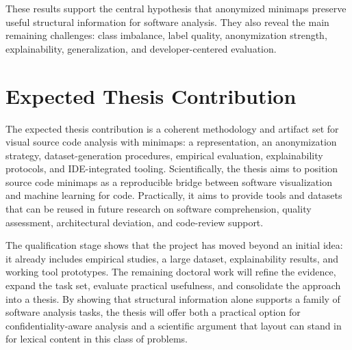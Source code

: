 These results support the central hypothesis that anonymized minimaps preserve
useful structural information for software analysis. They also reveal the main
remaining challenges: class imbalance, label quality, anonymization strength,
explainability, generalization, and developer-centered evaluation.

\section{Expected Thesis Contribution}

The expected thesis contribution is a coherent methodology and artifact set for
visual source code analysis with minimaps: a representation, an anonymization
strategy, dataset-generation procedures, empirical evaluation, explainability
protocols, and IDE-integrated tooling. Scientifically, the thesis aims to
position source code minimaps as a reproducible bridge between software
visualization and machine learning for code. Practically, it aims to provide
tools and datasets that can be reused in future research on software
comprehension, quality assessment, architectural deviation, and code-review
support.

The qualification stage shows that the project has moved beyond an initial
idea: it already includes empirical studies, a large dataset, explainability
results, and working tool prototypes. The remaining doctoral work will refine
the evidence, expand the task set, evaluate practical usefulness, and
consolidate the approach into a thesis. By showing that structural information
alone supports a family of software analysis tasks, the thesis will offer both
a practical option for confidentiality-aware analysis and a scientific argument
that layout can stand in for lexical content in this class of problems.
